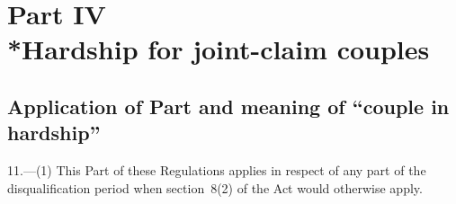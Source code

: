 \documentclass[12pt,a4paper]{article}
\begin{document}
\section[Part IV --- Hardship for joint-claim couples]{Part IV\\*Hardship for joint-claim couples}

\renewcommand\parthead{--- Part IV}

\subsection[11. Application of Part and meaning of “couple in hardship”]{Application of Part and meaning of “couple in hardship”}

11.---(1)  This Part of these Regulations applies in respect of any part of the disqualification period when section~8(2) of the Act would otherwise apply.
\end{document}
